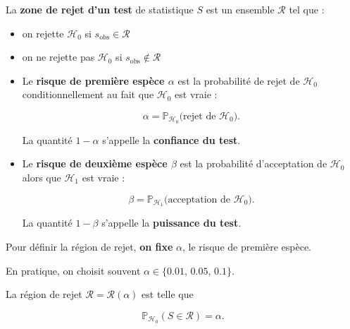 \begin{definition}
La \textbf{zone de rejet d'un test} de statistique $S$ est un ensemble $\mathcal{R}$ tel que :
\begin{itemize}
\item on rejette $\mathcal{H}_0$ si $s_{\text{obs}} \in \mathcal{R}$
\item on ne rejette pas $\mathcal{H}_0$ si $s_{\text{obs}} \notin \mathcal{R}$
\end{itemize}
\end{definition}

\begin{definition}
\begin{itemize}
\item Le \textbf{risque de première espèce $\alpha$} est la probabilité de rejet de $\mathcal{H}_0$ conditionnellement au fait que $\mathcal{H}_0$ est vraie :

\[
\alpha = \mathbb{P}_{\mathcal{H}_0} \big( \text{rejet de } \mathcal{H}_0 \big).
\]

La quantité $1-\alpha$ s'appelle la \textbf{confiance du test}.

\item Le \textbf{risque de deuxième espèce $\beta$} est la probabilité d'acceptation de $\mathcal{H}_0$ alors que $\mathcal{H}_1$ est vraie :

\[
\beta = \mathbb{P}_{\mathcal{H}_1} \big( \text{acceptation de } \mathcal{H}_0 \big).
\]

La quantité $1-\beta$ s'appelle la \textbf{puissance du test}.
\end{itemize}
\end{definition}

Pour définir la région de rejet, \textbf{on fixe} $\alpha$, le risque de première espèce.  

En pratique, on choisit souvent $\alpha \in \{0.01,\, 0.05,\, 0.1\}$.  

La région de rejet $\mathcal{R} = \mathcal{R}(\alpha)$ est telle que  

\[
\mathbb{P}_{\mathcal{H}_0}(S \in \mathcal{R}) = \alpha.
\]

